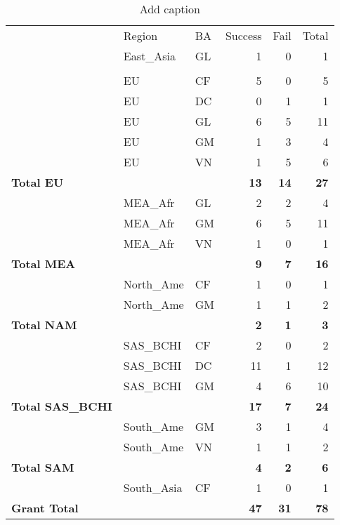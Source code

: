 \begin{table}[htbp]
	\centering
	\caption{Add caption}
	\begin{tabular}{lrrrrr}
		& \multicolumn{1}{l}{Region} & \multicolumn{1}{l}{BA} & \multicolumn{1}{l}{Success} & \multicolumn{1}{l}{Fail} & \multicolumn{1}{l}{Total} \\
		& \multicolumn{1}{l}{East\_Asia} & \multicolumn{1}{l}{GL} & 1     & 0     & 1 \\
		&       &       &       &       &  \\
		& \multicolumn{1}{l}{EU} & \multicolumn{1}{l}{CF} & 5     & 0     & 5 \\
		& \multicolumn{1}{l}{EU} & \multicolumn{1}{l}{DC} & 0     & 1     & 1 \\
		& \multicolumn{1}{l}{EU} & \multicolumn{1}{l}{GL} & 6     & 5     & 11 \\
		& \multicolumn{1}{l}{EU} & \multicolumn{1}{l}{GM} & 1     & 3     & 4 \\
		& \multicolumn{1}{l}{EU} & \multicolumn{1}{l}{VN} & 1     & 5     & 6 \\
		\textbf{Total EU} &       &       & \textbf{13} & \textbf{14} & \textbf{27} \\
		& \multicolumn{1}{l}{MEA\_Afr} & \multicolumn{1}{l}{GL} & 2     & 2     & 4 \\
		& \multicolumn{1}{l}{MEA\_Afr} & \multicolumn{1}{l}{GM} & 6     & 5     & 11 \\
		& \multicolumn{1}{l}{MEA\_Afr} & \multicolumn{1}{l}{VN} & 1     & 0     & 1 \\
		\textbf{Total MEA} &       &       & \textbf{9} & \textbf{7} & \textbf{16} \\
		& \multicolumn{1}{l}{North\_Ame} & \multicolumn{1}{l}{CF} & 1     & 0     & 1 \\
		& \multicolumn{1}{l}{North\_Ame} & \multicolumn{1}{l}{GM} & 1     & 1     & 2 \\
		\textbf{Total NAM} &       &       & \textbf{2} & \textbf{1} & \textbf{3} \\
		& \multicolumn{1}{l}{SAS\_BCHI} & \multicolumn{1}{l}{CF} & 2     & 0     & 2 \\
		& \multicolumn{1}{l}{SAS\_BCHI} & \multicolumn{1}{l}{DC} & 11    & 1     & 12 \\
		& \multicolumn{1}{l}{SAS\_BCHI} & \multicolumn{1}{l}{GM} & 4     & 6     & 10 \\
		\textbf{Total SAS\_BCHI} &       &       & \textbf{17} & \textbf{7} & \textbf{24} \\
		& \multicolumn{1}{l}{South\_Ame} & \multicolumn{1}{l}{GM} & 3     & 1     & 4 \\
		& \multicolumn{1}{l}{South\_Ame} & \multicolumn{1}{l}{VN} & 1     & 1     & 2 \\
		\textbf{Total SAM} &       &       & \textbf{4} & \textbf{2} & \textbf{6} \\
		& \multicolumn{1}{l}{South\_Asia} & \multicolumn{1}{l}{CF} & 1     & 0     & 1 \\
		\textbf{Grant Total} &       &       & \textbf{47} & \textbf{31} & \textbf{78} \\
	\end{tabular}%
	\label{tab:addlabel}%
\end{table}%
